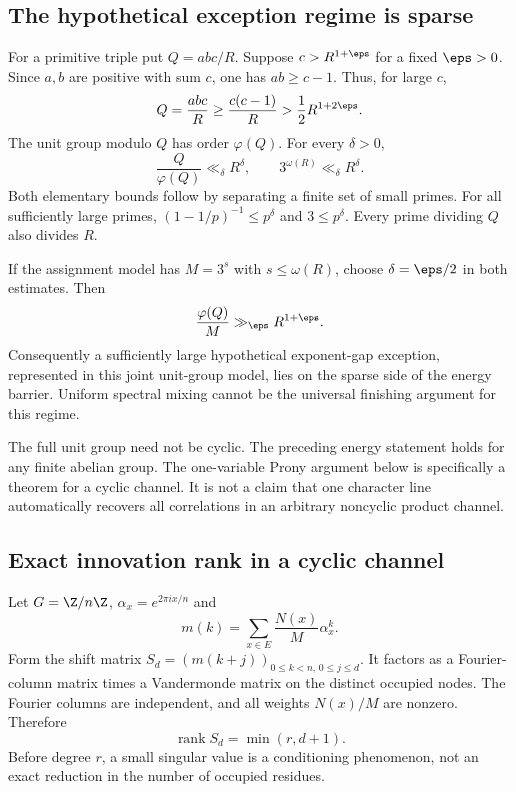 \subsection{The hypothetical exception regime is sparse}
For a primitive triple put $Q=abc/R$. Suppose $c>R^{1+\eps}$ for a fixed $\eps>0$. Since $a,b$ are positive with sum $c$, one has $ab\ge c-1$. Thus, for large $c$,
\[
 Q=\frac{abc}{R}\ge\frac{c(c-1)}R>\frac12R^{1+2\eps}.
\]
The unit group modulo $Q$ has order $\varphi(Q)$. For every $\delta>0$,
\[
 \frac Q{\varphi(Q)}\ll_\delta R^\delta,
 \qquad 3^{\omega(R)}\ll_\delta R^\delta.
\]
Both elementary bounds follow by separating a finite set of small primes. For all sufficiently large primes, $(1-1/p)^{-1}\le p^\delta$ and $3\le p^\delta$. Every prime dividing $Q$ also divides $R$.

If the assignment model has $M=3^s$ with $s\le\omega(R)$, choose $\delta=\eps/2$ in both estimates. Then
\[
 \frac{\varphi(Q)}M\gg_\eps R^{1+\eps}.
\]
Consequently a sufficiently large hypothetical exponent-gap exception, represented in this joint unit-group model, lies on the sparse side of the energy barrier. Uniform spectral mixing cannot be the universal finishing argument for this regime.

The full unit group need not be cyclic. The preceding energy statement holds for any finite abelian group. The one-variable Prony argument below is specifically a theorem for a cyclic channel. It is not a claim that one character line automatically recovers all correlations in an arbitrary noncyclic product channel.

\subsection{Exact innovation rank in a cyclic channel}
Let $G=\Z/n\Z$, $\alpha_x=e^{2\pi ix/n}$ and
\[
 m(k)=\sum_{x\in E}\frac{N(x)}M\alpha_x^k.
\]
Form the shift matrix $S_d=(m(k+j))_{0\le k<n,\,0\le j\le d}$. It factors as a Fourier-column matrix times a Vandermonde matrix on the distinct occupied nodes. The Fourier columns are independent, and all weights $N(x)/M$ are nonzero. Therefore
\[
 \boxed{\operatorname{rank}S_d=\min(r,d+1).}
\]
Before degree $r$, a small singular value is a conditioning phenomenon, not an exact reduction in the number of occupied residues.

